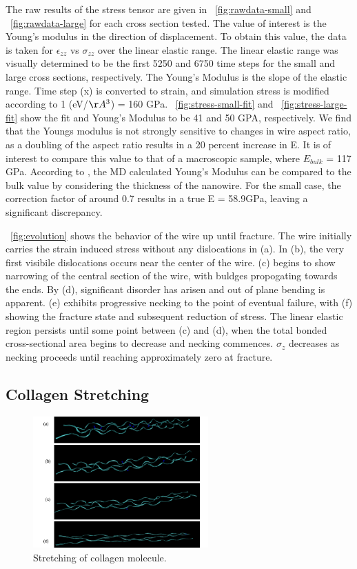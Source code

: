 \documentclass[11pt]{report}
\begin{document}
        The raw results of the stress tensor are given in ~\ref{fig:rawdata-small} and ~\ref{fig:rawdata-large} for each cross section tested.  The value of interest is the Young's modulus in the direction of displacement.  To obtain this value, the data is taken for $\epsilon_{zz}$ vs $\sigma_{zz}$ over the linear elastic range.  The linear elastic range was visually determined to be the first 5250 and 6750 time steps for the small and large cross sections, respectively.  The Young's Modulus is the slope of the elastic range. Time step (x) is converted to strain, and simulation stress is modified according to 1 (eV/$\AA^3$) = 160 GPa. ~\ref{fig:stress-small-fit} and ~\ref{fig:stress-large-fit} show the fit and Young's Modulus to be 41 and 50 GPA, respectively.  We find that the Youngs modulus is not strongly sensitive to changes in wire aspect ratio, as a doubling of the aspect ratio results in a 20 percent increase in E.  It is of interest to compare this value to that of a macroscopic sample, where $E_{bulk}$ = 117 GPa.  According to \cite{Liang}, the MD calculated Young's Modulus can be compared to the bulk value by considering the thickness of the nanowire.  For the small case, the correction factor of around 0.7 results in a true E = 58.9GPa, leaving a significant discrepancy.

        ~\ref{fig:evolution} shows the behavior of the wire up until fracture. The wire initially carries the strain induced stress without any dislocations in (a).  In (b), the very first visibile dislocations occurs near the center of the wire. (c) begins to show narrowing of the central section of the wire, with buldges propogating towards the ends.   By (d), significant disorder has arisen and out of plane bending is apparent.  (e) exhibits progressive necking to the point of eventual failure, with (f) showing the fracture state and subsequent reduction of stress.  The linear elastic region persists until some point between (c) and (d), when the total bonded cross-sectional area begins to decrease and necking commences.  $\sigma_{z}$ decreases as necking proceeds until reaching approximately zero at fracture.


        \subsection{Collagen Stretching}

        \begin{figure}[!htb]
            \label{fig:coll-evolution}
            \centering
            \includegraphics[width=0.6\textwidth]{coll-evol.png}
            \caption{Stretching of collagen molecule.}
        \end{figure}
\end{document}
